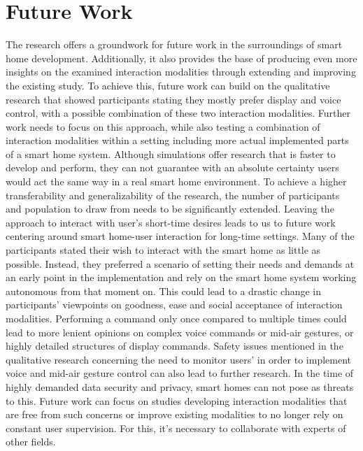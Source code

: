 \documentclass[sigchi]{acmart}
\begin{document}
	\section{Future Work}
	The research offers a groundwork for future work in the surroundings of smart home development. Additionally, it also provides the base of producing even more insights on the examined interaction modalities through extending and improving the existing study. To achieve this, future work can build on the qualitative research that showed participants stating they mostly prefer display and voice control, with a possible combination of these two interaction modalities. Further work needs to focus on this approach, while also testing a combination of interaction modalities within a setting including more actual implemented parts of a smart home system. Although simulations offer research that is faster to develop and perform, they can not guarantee with an absolute certainty users would act the same way in a real smart home environment. To achieve a higher transferability and generalizability of the research, the number of participants and population to draw from needs to be significantly extended. 
	Leaving the approach to interact with user's short-time desires leads to us to future work centering around smart home-user interaction for long-time settings. Many of the participants stated their wish to interact with the smart home as little as possible. Instead, they preferred a scenario of setting their needs and demands at an early point in the implementation and rely on the smart home system working autonomous from that moment on. This could lead to a drastic change in participants' viewpoints on goodness, ease and social acceptance of interaction modalities. Performing a command only once compared to multiple times could lead to more lenient opinions on complex voice commands or mid-air gestures, or highly detailed structures of display commands.
	Safety issues mentioned in the qualitative research concerning the need to monitor users' in order to implement voice and mid-air gesture control can also lead to further research. In the time of highly demanded data security and privacy, smart homes can not pose as threats to this. Future work can focus on studies developing interaction modalities that are free from such concerns or improve existing modalities to no longer rely on constant user supervision. For this, it's necessary to collaborate with experts of other fields.
	
	
	
	
	
\end{document}
